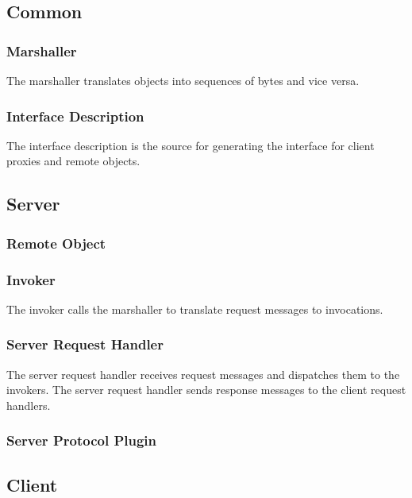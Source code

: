\documentclass[a4paper]{article}
\begin{document}
\cite{zdun2008}

\subsection{Common}
\subsubsection{Marshaller}

The marshaller translates objects into sequences of bytes and vice versa.

\subsubsection{Interface Description}

The interface description is the source for generating the interface for client proxies and remote objects.

\subsection{Server}

\subsubsection{Remote Object}

\subsubsection{Invoker}

The invoker calls the marshaller to translate request messages to invocations.

\subsubsection{Server Request Handler}

The server request handler receives request messages and dispatches them to the invokers.
The server request handler sends response messages to the client request handlers.

\subsubsection{Server Protocol Plugin}

\subsection{Client}
\end{document}
